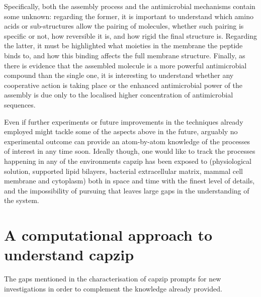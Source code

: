 Specifically, both the assembly process and the antimicrobial mechanisms contain some unknown: regarding the former, it is important to understand which amino acids or sub-structures allow the pairing of molecules, whether such pairing is specific or not, how reversible it is, and how rigid the final structure is.
%
Regarding the latter, it must be highlighted what moieties in the membrane the peptide binds to, and how this binding affects the full membrane structure. Finally, as there is evidence that the assembled molecule is a more powerful antimicrobial compound than the single one, it is interesting to understand whether any cooperative action is taking place or the enhanced antimicrobial power of the assembly is due only to the localised higher concentration of antimicrobial sequences.

Even if further experiments or future improvements in the techniques already employed might tackle some of the aspects above in the future, arguably no experimental outcome can provide an atom-by-atom knowledge of the processes of interest in any time soon. Ideally though, one would like to track the processes happening in any of the environments capzip has been exposed to (physiological solution, supported lipid bilayers, bacterial extracellular matrix, mammal cell membrane and cytoplasm) both in space and time with the finest level of details, and the impossibility of pursuing that leaves large gaps in the understanding of the system.


\section{A computational approach to understand capzip}

The gaps mentioned in the characterisation of capzip prompts for new investigations in order to complement the knowledge already provided.

